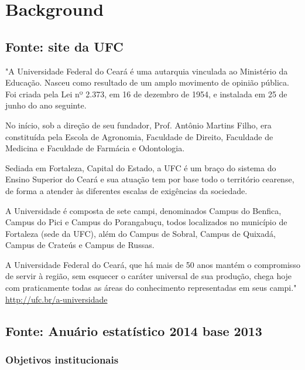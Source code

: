 \documentclass{report}
\begin{document}
\listoftodos

\tableofcontents

\chapter{Background}

\section{Fonte: site da UFC}

"A Universidade Federal do Ceará é uma autarquia vinculada ao Ministério da Educação. Nasceu como resultado de um amplo movimento de opinião pública. Foi criada pela Lei nº 2.373, em 16 de dezembro de 1954, e instalada em 25 de junho do ano seguinte.

No início, sob a direção de seu fundador, Prof. Antônio Martins Filho, era constituída pela Escola de Agronomia, Faculdade de Direito, Faculdade de Medicina e Faculdade de Farmácia e Odontologia.

Sediada em Fortaleza, Capital do Estado, a UFC é um braço do sistema do Ensino Superior do Ceará e sua atuação tem por base todo o território cearense, de forma a atender às diferentes escalas de exigências da sociedade.

A Universidade é composta de sete campi, denominados Campus do Benfica, Campus do Pici e Campus do Porangabuçu, todos localizados no município de Fortaleza (sede da UFC), além do Campus de Sobral, Campus de Quixadá, Campus de Crateús e Campus de Russas.

A Universidade Federal do Ceará, que há mais de 50 anos mantém o compromisso de servir à região, sem esquecer o caráter universal de sua produção, chega hoje com praticamente todas as áreas do conhecimento representadas em seus campi." \url{http://ufc.br/a-universidade}

\section{Fonte: Anuário estatístico 2014 base 2013}

\cite{anuario_2014_base_2013}

\subsection{Objetivos institucionais}
\end{document}
